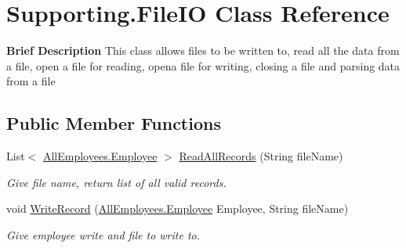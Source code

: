 \hypertarget{class_supporting_1_1_file_i_o}{}\section{Supporting.\+File\+I\+O Class Reference}
\label{class_supporting_1_1_file_i_o}


{\bfseries Brief Description} This class allows files to be written to, read all the data from a file, open a file for reading, opena file for writing, closing a file and parsing data from a file  


\subsection*{Public Member Functions}
\begin{DoxyCompactItemize}
\item 
List$<$ \hyperlink{class_all_employees_1_1_employee}{All\+Employees.\+Employee} $>$ \hyperlink{class_supporting_1_1_file_i_o_ab33154b7acbb27ecaee49cfe701691e7}{Read\+All\+Records} (String file\+Name)
\begin{DoxyCompactList}\small\item\em Give file name, return list of all valid records. \end{DoxyCompactList}\item 
void \hyperlink{class_supporting_1_1_file_i_o_a23293f70ec655e87ea568ffada174b9f}{Write\+Record} (\hyperlink{class_all_employees_1_1_employee}{All\+Employees.\+Employee} Employee, String file\+Name)
\begin{DoxyCompactList}\small\item\em Give employee write and file to write to. \end{DoxyCompactList}\end{DoxyCompactItemize}
